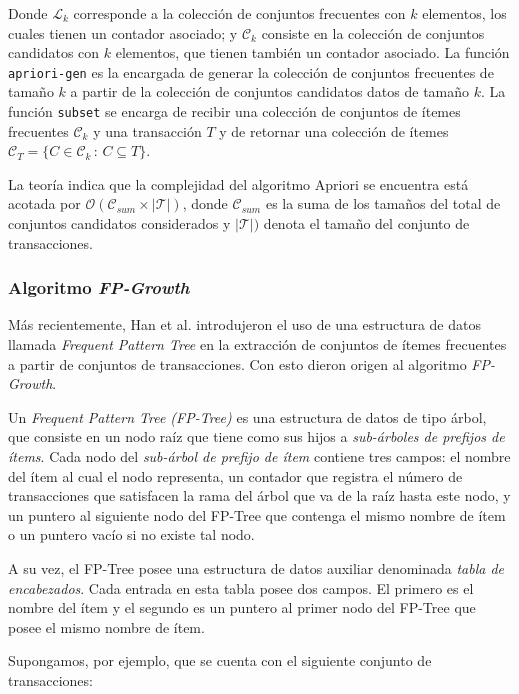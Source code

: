 Donde $\mathcal{L}_k$ corresponde a la colección de conjuntos frecuentes con $k$ elementos, los cuales tienen un contador asociado; y $\mathcal{C}_k$ consiste en la colección de conjuntos candidatos con $k$ elementos, que tienen también un contador asociado. La función \texttt{apriori-gen} es la encargada de generar la colección de conjuntos frecuentes de tamaño $k$ a partir de la colección de conjuntos candidatos datos de tamaño $k$. La función \texttt{subset} se encarga de recibir una colección de conjuntos de ítemes frecuentes $\mathcal{C}_k$ y una transacción $T$ y de retornar una colección de ítemes $\mathcal{C}_T = \{C \in \mathcal{C}_k \, : \, C \subseteq T\}$.

La teoría indica que la complejidad del algoritmo Apriori se encuentra está acotada por $\mathcal{O}(\mathcal{C}_{\mathit{sum}} \times |\mathcal{T}|)$, donde $\mathcal{C}_{\mathit{sum}}$ es la suma de los tamaños del total de conjuntos candidatos considerados y $|\mathcal{T}|)$ denota el tamaño del conjunto de transacciones.

\subsubsection{Algoritmo \textit{FP-Growth}}

Más recientemente, Han et al. introdujeron el uso de una estructura de datos llamada \textit{Frequent Pattern Tree}\cite{han2004mining} en la extracción de conjuntos de ítemes frecuentes a partir de conjuntos de transacciones. Con esto dieron origen al algoritmo \textit{FP-Growth}.

Un \textit{Frequent Pattern Tree (FP-Tree)} es una estructura de datos de tipo árbol, que consiste en un nodo raíz que tiene como sus hijos a \textit{sub-árboles de prefijos de ítems}. Cada nodo del \textit{sub-árbol de prefijo de ítem} contiene tres campos: el nombre del ítem al cual el nodo representa, un contador que registra el número de transacciones que satisfacen la rama del árbol que va de la raíz hasta este nodo, y un puntero al siguiente nodo del FP-Tree que contenga el mismo nombre de ítem o un puntero vacío si no existe tal nodo.

A su vez, el FP-Tree posee una estructura de datos auxiliar denominada \textit{tabla de encabezados}. Cada entrada en esta tabla posee dos campos. El primero es el nombre del ítem y el segundo es un puntero al primer nodo del FP-Tree que posee el mismo nombre de ítem.

Supongamos, por ejemplo, que se cuenta con el siguiente conjunto de transacciones:

